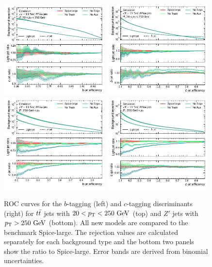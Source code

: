 \begin{figure}[ht]
    \centering
    \includegraphics[width=0.49\textwidth]{figures/flavour_tagging/b_roc_ttbar_aux.pdf}
    \includegraphics[width=0.49\textwidth]{figures/flavour_tagging/c_roc_ttbar_aux.pdf}
    \includegraphics[width=0.49\textwidth]{figures/flavour_tagging/b_roc_zprime_aux.pdf}
    \includegraphics[width=0.49\textwidth]{figures/flavour_tagging/c_roc_zprime_aux.pdf}
    \caption{ROC curves for the $b$-tagging (left) and $c$-tagging discriminants (right) for $t\bar{t}$ jets with $20 < \pt < 250~\GeV$ (top) and $Z'$ jets with $\pt > 250~\GeV$ (bottom).
    All new models are compared to the benchmark Spice-large. The rejection values are calculated separately for each background type and the bottom two panels show the ratio to Spice-large. Error bands are derived from binomial uncertainties.}
    \label{fig:auxiliary}
\end{figure}

